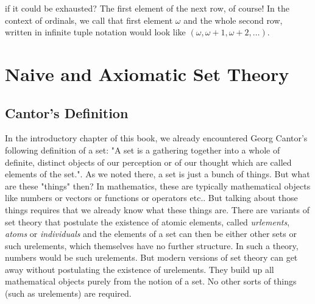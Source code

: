 if it could be exhausted? The first element of the next row, of course! In the context of ordinals, we call that first element $\omega$ and the whole second row, written in infinite tuple notation would look like $(\omega, \omega+1, \omega+2, \ldots)$.


\section{Naive and Axiomatic Set Theory}


\subsection{Cantor's Definition}
In the introductory chapter of this book, we already encountered Georg Cantor's following definition of a set: "A set is a gathering together into a whole of definite, distinct objects of our perception or of our thought which are called elements of the set.". As we noted there, a set is just a bunch of things. But what are these "things" then? In mathematics, these are typically mathematical objects like numbers or vectors or functions or operators etc.. But talking about those things requires that we already know what these things are. There are variants of set theory that postulate the existence of atomic elements, called \emph{urlements}, \emph{atoms} or \emph{individuals} and the elements of a set can then be either other sets or such urelements, which themselves have no further structure. In such a theory, numbers would be such urelements. But modern versions of set theory can get away without postulating the existence of urelements. They build up all mathematical objects purely from the notion of a set. No other sorts of things (such as urelements) are required. 



